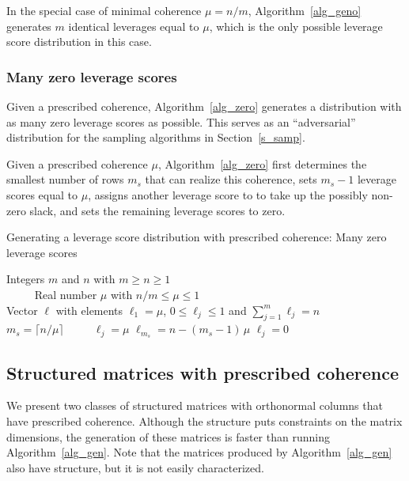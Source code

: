 \documentclass{siamltex}
\begin{document}
In the special case of minimal coherence $\mu=n/m$,
Algorithm~\ref{alg_geno} generates $m$ identical leverages equal to
$\mu$, which is the only possible leverage score distribution in this case.

\subsubsection*{Many zero leverage scores}
Given a prescribed coherence, Algorithm~\ref{alg_zero}
generates a distribution with as many zero leverage scores as possible.
This serves as an ``adversarial'' distribution for the sampling algorithms
in Section~\ref{s_samp}. 

Given a prescribed coherence $\mu$, Algorithm~\ref{alg_zero} first determines 
the smallest number of rows $m_s$ that can realize this coherence, 
sets $m_s-1$ leverage scores equal to $\mu$, assigns another leverage score to
to take up the possibly non-zero slack, and sets the remaining 
leverage scores to zero.

\begin{algorithm}
\caption{Generating a leverage score distribution with prescribed coherence:
Many zero leverage scores}\label{alg_zero}
\begin{algorithmic}
\REQUIRE Integers $m$ and $n$ with $m\geq n\geq 1$\\
$\qquad\ $ Real number $\mu$ with $n/m\leq \mu\leq 1$\\
\ENSURE  Vector $\ell$ with elements $\ell_1=\mu$, $0\leq \ell_j \leq 1$ 
and $\sum_{j=1}^m{\ell_j}=n$\\
$\qquad$\\
\STATE $m_s=\lceil n/\mu\rceil$ $\qquad$ 
\STATE $\ell_j=\mu$ 
\ENDFOR
\STATE $\ell_{m_s}= n-(m_s-1)\,\mu$
\STATE $\ell_j=0$ 
\ENDFOR
\end{algorithmic}
\end{algorithm}

\subsection{Structured matrices with prescribed coherence}\label{s_mat}
We present two clas\-ses of structured matrices with orthonormal columns
that have prescribed coherence.  Although the structure puts constraints on the
matrix dimensions, the generation of these matrices is faster than
running Algorithm~\ref{alg_gen}. Note that the matrices produced by
Algorithm~\ref{alg_gen} also have structure, but it is not easily
characterized.
\end{document}
